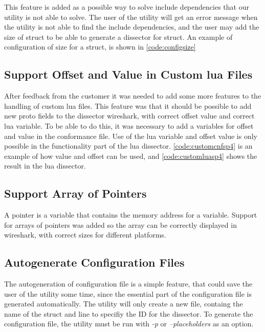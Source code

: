 This feature is added as a possible way to solve include dependencies that our 
\gls{utility} is not able to solve. The user of the \gls{utility} will get an error 
message when the \gls{utility} is not able to find the include dependencies, and the 
user may add the size of \gls{struct} to be able to generate a \gls{dissector} for \gls{struct}. 
An example of configuration of size for a \gls{struct}, is shown in 
\autoref{code:configsize}



\subsection{Support Offset and Value in Custom \Gls{lua} Files}
After feedback from the customer it was needed to add some more features to 
the handling of custom \Gls{lua} files. This feature was that it should be possible 
to add new proto fields to the \gls{dissector} \Gls{wireshark}, with correct offset value 
and correct \Gls{lua} variable. To be able to do this, it was necessary to add a 
variables for offset and value in the conformance file. Use of the \Gls{lua} 
variable and offset value is only possible in the functionality part of the 
\Gls{lua} \gls{dissector}. \autoref{code:customcnfsp4} is an example of how value and 
offset can be used, and \autoref{code:customluasp4} shows the result in the \Gls{lua} 
\gls{dissector}.





\subsection{Support Array of Pointers}
A pointer is a variable that contains the memory address for a variable. 
Support for arrays of pointers was added so the array can be correctly 
displayed in \Gls{wireshark}, with correct sizes for different platforms.

\subsection{Autogenerate Configuration Files}
The autogeneration of configuration file is a simple feature, that could save 
the user of the \gls{utility} some time, since the essential part of the 
configuration file is generated automatically. The \gls{utility} will only create a new 
file, containg the name of the \gls{struct} and line to specifiy the ID for the 
\gls{dissector}. To generate the configuration file, the \gls{utility} must be run with 
\emph{-p} or \emph{--placeholders} as an option. 

